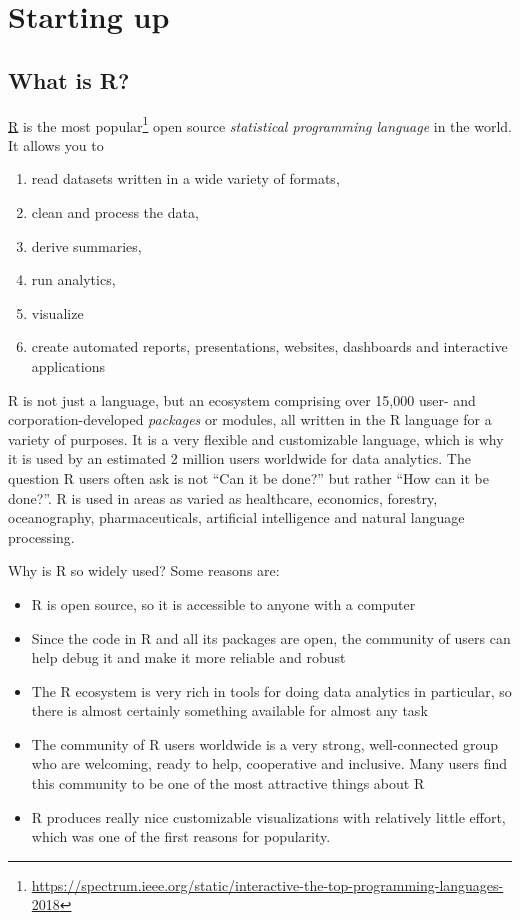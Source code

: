 \documentclass[12pt,letterpaperpaper,openany]{book}
\providecommand{\tightlist}{%
  \setlength{\itemsep}{0pt}\setlength{\parskip}{0pt}}
\let\rmarkdownfootnote\footnote%
\def\footnote{\protect\rmarkdownfootnote}
\begin{document}
\hypertarget{part-starting-up}{%
\part*{Starting up}\label{part-starting-up}}

\hypertarget{what-is-r}{%
\chapter{What is R?}\label{what-is-r}}

\href{https://www.r-project.org}{R} is the
most popular\footnote{\url{https://spectrum.ieee.org/static/interactive-the-top-programming-languages-2018}} open source \emph{statistical programming language} in the world. It
allows you to

\begin{enumerate}
\def\labelenumi{\arabic{enumi}.}
\tightlist
\item
  read datasets written in a wide variety of formats,
\item
  clean and process the data,
\item
  derive summaries,
\item
  run analytics,
\item
  visualize
\item
  create automated reports, presentations, websites, dashboards and interactive applications
\end{enumerate}

R is not just a language, but an ecosystem comprising over 15,000 user- and corporation-developed
\emph{packages} or modules, all written in the R language for a variety of purposes. It is a very flexible and customizable language, which is why it is used by an estimated 2 million users worldwide for data analytics.
The question R users often ask is not ``Can it be done?'' but rather ``How can it be done?''. R is used
in areas as varied as healthcare, economics, forestry, oceanography, pharmaceuticals, artificial
intelligence and natural language processing.

Why is R so widely used? Some reasons are:

\begin{itemize}
\tightlist
\item
  R is open source, so it is accessible to anyone with a computer
\item
  Since the code in R and all its packages are open, the community of users can help debug it
  and make it more reliable and robust
\item
  The R ecosystem is very rich in tools for doing data analytics in particular, so there is almost
  certainly something available for almost any task
\item
  The community of R users worldwide is a very strong, well-connected group who are welcoming,
  ready to help, cooperative and inclusive. Many users find this community to be one of the most
  attractive things about R
\item
  R produces really nice customizable visualizations with relatively little effort, which was one of the
  first reasons for popularity.
\end{itemize}
\end{document}

